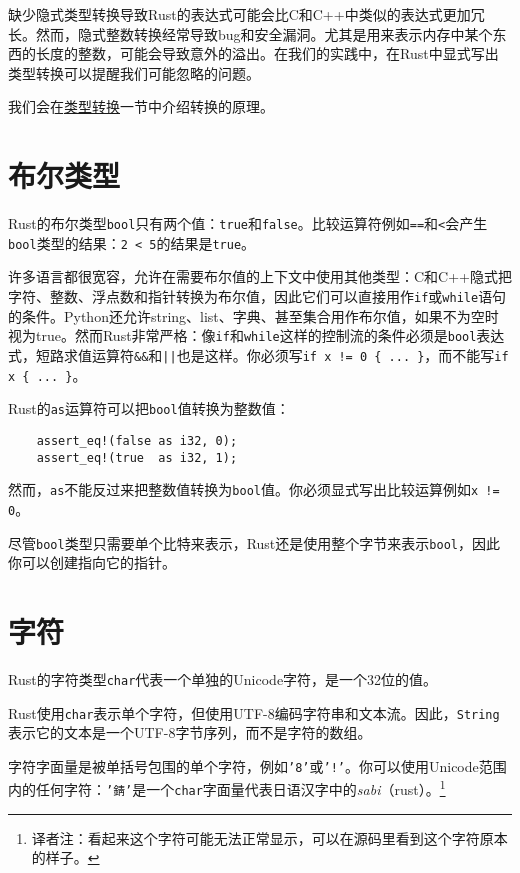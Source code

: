缺少隐式类型转换导致Rust的表达式可能会比C和C++中类似的表达式更加冗长。然而，隐式整数转换经常导致bug和安全漏洞。尤其是用来表示内存中某个东西的长度的整数，可能会导致意外的溢出。在我们的实践中，在Rust中显式写出类型转换可以提醒我们可能忽略的问题。

我们会在\hyperref[cast]{类型转换}一节中介绍转换的原理。

\section{布尔类型}

Rust的布尔类型\texttt{bool}只有两个值：\texttt{true}和\texttt{false}。比较运算符例如\texttt{==}和\texttt{<}会产生\texttt{bool}类型的结果：\texttt{2 < 5}的结果是\texttt{true}。

许多语言都很宽容，允许在需要布尔值的上下文中使用其他类型：C和C++隐式把字符、整数、浮点数和指针转换为布尔值，因此它们可以直接用作\texttt{if}或\texttt{while}语句的条件。Python还允许string、list、字典、甚至集合用作布尔值，如果不为空时视为true。然而Rust非常严格：像\texttt{if}和\texttt{while}这样的控制流的条件必须是\texttt{bool}表达式，短路求值运算符\texttt{\&\&}和\texttt{||}也是这样。你必须写\texttt{if x != 0 \{ ... \}}，而不能写\texttt{if x \{ ... \}}。

Rust的\texttt{as}运算符可以把\texttt{bool}值转换为整数值：
\begin{verbatim}
    assert_eq!(false as i32, 0);
    assert_eq!(true  as i32, 1);
\end{verbatim}

然而，\texttt{as}不能反过来把整数值转换为\texttt{bool}值。你必须显式写出比较运算例如\texttt{x != 0}。

尽管\texttt{bool}类型只需要单个比特来表示，Rust还是使用整个字节来表示\texttt{bool}，因此你可以创建指向它的指针。

\section{字符}\label{char}
Rust的字符类型\texttt{char}代表一个单独的Unicode字符，是一个32位的值。

Rust使用\texttt{char}表示单个字符，但使用UTF-8编码字符串和文本流。因此，\texttt{String}表示它的文本是一个UTF-8字节序列，而不是字符的数组。

字符字面量是被单括号包围的单个字符，例如\texttt{'8'}或\texttt{'!'}。你可以使用Unicode范围内的任何字符：\texttt{'錆'}是一个\texttt{char}字面量代表日语汉字中的\emph{sabi}（rust）。\footnote{译者注：看起来这个字符可能无法正常显示，可以在源码里看到这个字符原本的样子。}

